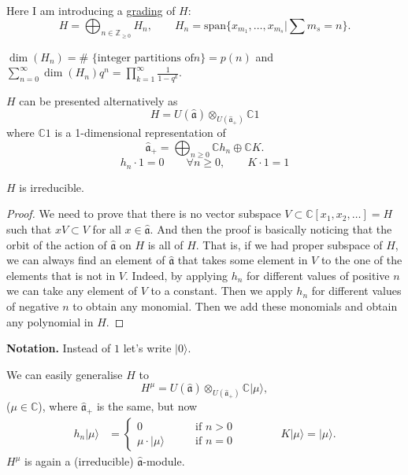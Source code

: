Here I am introducing a \underline{grading}
of $H$:
$$
H=\bigoplus_{n \in \mathbb{Z}_{\geq 0}}H_n,
\qquad
H_n=\text{span}\{x_{m_1},\ldots,x_{m_s}|
\sum m_s=n\}.
$$

\begin{remark}
\label{remark-dimen-numbe-parti}
$\dim(H_n)=$\# $\{\text{integer partitions of
}n\}=p(n)$
and $\sum_{n=0}^\infty
\dim(H_n)q^n=\prod_{k=1}^\infty
\frac{1}{1-q^k}$.
\end{remark}

\begin{remark}
\label{remark-Verma-module-style}
$H$ can be presented alternatively as
$$
H=U(\hat{\mathfrak{a}})
\otimes_{U(\hat{\mathfrak{a}}_+)}\mathbb{C}1
$$
where $\mathbb{C}1$ is a 1-dimensional
representation of
 $$
\hat{\mathfrak{a}}_+=\bigoplus_{n \geq
0}\mathbb{C}h_n \oplus\mathbb{C}K.
$$
$$
h_n \cdot 1=0\qquad \forall n \geq 0,\qquad
K\cdot 1=1
$$
\end{remark}

\begin{exercise}
\label{exercise-H-is-irreducible}
$H$ is irreducible.
\end{exercise}

\begin{proof}
We need to prove that there is no
vector subspace $V \subset
\mathbb{C}[x_1,x_2,\ldots]=H$
such that $xV \subset V$ for all $x \in
\hat{\mathfrak{a}}$.
And then the proof is basically noticing
that the orbit of the action of
$\hat{\mathfrak{a}}$ on $H$
is all of $H$. That is, if we had proper
subspace
of $H$, we can always find an element of
$\hat{\mathfrak{a}}$
that takes some element in $V$ to the one of
the
elements that is not in $V$. Indeed, by
applying
$h_n$ for  different values of positive  $n$
we can take
any element of $V$ to a constant. Then we
apply
$h_n$ for different values of negative $n$ to
obtain
any monomial. Then we add these monomials and
obtain any
polynomial in $H$.
\end{proof}

\noindent
{\bf Notation.} Instead of $1$ let's write
$|0\rangle$.

\begin{remark}
\label{remark-generalise-H}
We can easily generalise $H$ to
$$
H^\mu=U(\hat{\mathfrak{a}})
\otimes_{U(\hat{\mathfrak{a}}_+)} \mathbb{C}
|\mu\rangle,
$$
($\mu \in \mathbb{C}$), where
$\hat{\mathfrak{a}}_+$ is the same, but now
\begin{align*}
h_n |\mu\rangle&=\begin{cases}
0\qquad &\text{if }n>0 \\
\mu \cdot|\mu\rangle\qquad& \text{if }n=0
\end{cases}\qquad \qquad
K|\mu\rangle=|\mu\rangle.
\end{align*}
$H^\mu$ is again a (irreducible)
$\hat{\mathfrak{a}}$-module.
\end{remark}

